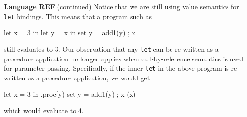 \begin{minipage}[t]{\sw}
\slidenumber
\LARGE
{\bf Language REF} (continued)\exx
Notice that we are still using value semantics for \verb'let' bindings.
This means that a program such as
\Large
\begin{qv}
let
  x = 3
in
  let
    y = x
  in
    { set y = add1(y) ; x }
\end{qv}
\LARGE
still evaluates to 3.\exx
Our observation that any \verb'let' can be re-written
as a procedure application no longer applies
when call-by-reference semantics is used for parameter passing.
Specifically, if the inner \verb'let' in the above program
is re-written as a procedure application, we would get
\Large
\begin{qv}
let
  x = 3 
in
  .proc(y) {set y = add1(y) ; x } (x)
\end{qv}
\LARGE
which would evaluate to 4.
\end{minipage}
